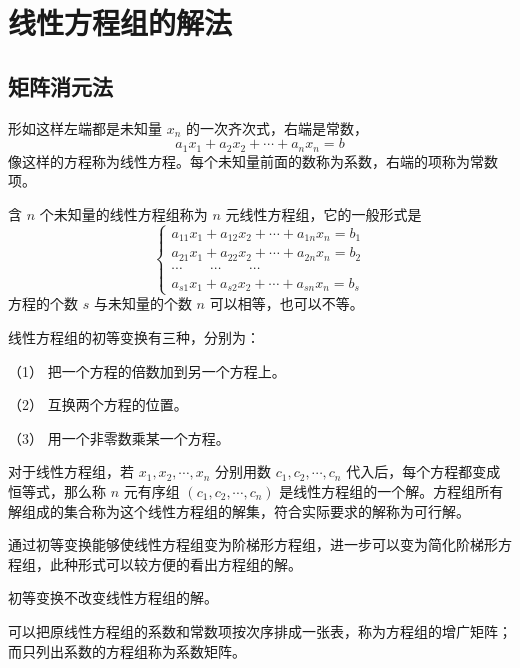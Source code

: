 \chapter{线性方程组的解法}

\section{矩阵消元法}

形如这样左端都是未知量 $x_n$ 的一次齐次式，右端是常数，
$$a_1x_1+a_2x_2+\cdots+a_nx_n=b$$
像这样的方程称为线性方程。每个未知量前面的数称为系数，右端的项称为常数项。

含 $n$ 个未知量的线性方程组称为 $n$ 元线性方程组，它的一般形式是
\begin{equation*}
	\left\{
		\begin{matrix}
			a_{11}x_1+a_{12}x_2+\cdots+a_{1n}x_n=b_1\\
			a_{21}x_1+a_{22}x_2+\cdots+a_{2n}x_n=b_2\\
			\cdots\qquad\cdots\qquad\cdots\\
			a_{s1}x_1+a_{s2}x_2+\cdots+a_{sn}x_n=b_s
		\end{matrix}
	\right.
\end{equation*}
方程的个数 $s$ 与未知量的个数 $n$ 可以相等，也可以不等。

\begin{definition}[线性方程组的初等变换]
	线性方程组的初等变换有三种，分别为：
	
	（1） 把一个方程的倍数加到另一个方程上。

	（2） 互换两个方程的位置。

	（3） 用一个非零数乘某一个方程。
\end{definition}

对于线性方程组，若 $x_1,x_2,\cdots,x_n$ 分别用数 $c_1,c_2,\cdots,c_n$ 代入后，每个方程都变成恒等式，那么称 $n$ 元有序组 $(c_1,c_2,\cdots,c_n)$ 是线性方程组的一个解。方程组所有解组成的集合称为这个线性方程组的解集，符合实际要求的解称为可行解。

通过初等变换能够使线性方程组变为阶梯形方程组，进一步可以变为简化阶梯形方程组，此种形式可以较方便的看出方程组的解。

\begin{theorem}
	初等变换不改变线性方程组的解。
\end{theorem}

可以把原线性方程组的系数和常数项按次序排成一张表，称为方程组的增广矩阵；而只列出系数的方程组称为系数矩阵。

